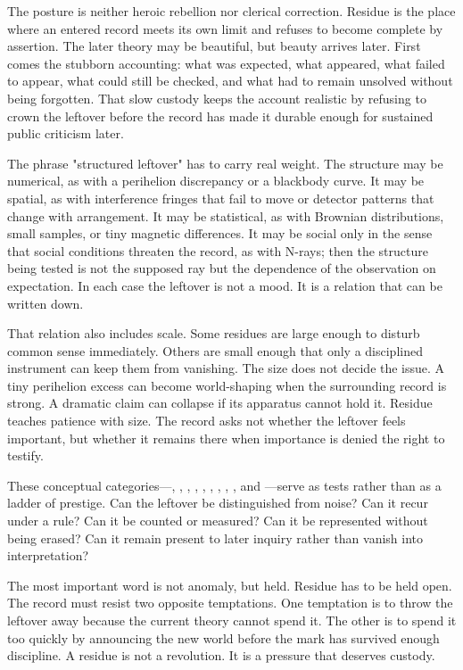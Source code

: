 \begin{chapteressay}
The posture is neither heroic rebellion nor clerical correction. Residue is the
place where an entered record meets its own limit and refuses to become complete
by assertion. The later theory may be beautiful, but beauty arrives later.
First comes the stubborn accounting: what was expected, what appeared, what
failed to appear, what could still be checked, and what had to remain unsolved
without being forgotten. That slow custody keeps the account realistic by
refusing to crown the leftover before the record has made it durable enough for
sustained public criticism later.

The phrase "structured leftover" has to carry real weight. The structure may
be numerical, as with a perihelion discrepancy or a blackbody curve. It may be
spatial, as with interference fringes that fail to move or detector patterns
that change with arrangement. It may be statistical, as with Brownian
distributions, small samples, or tiny magnetic differences. It may be social
only in the sense that social conditions threaten the record, as with N-rays;
then the structure being tested is not the supposed ray but the dependence of
the observation on expectation. In each case the leftover is not a mood. It is
a relation that can be written down.

That relation also includes scale. Some residues are large enough to disturb
common sense immediately. Others are small enough that only a disciplined
instrument can keep them from vanishing. The size does not decide the issue.
A tiny perihelion excess can become world-shaping when the surrounding record
is strong. A dramatic claim can collapse if its apparatus cannot hold it.
Residue teaches patience with size. The record asks not whether the leftover
feels important, but whether it remains there when importance is denied the
right to testify.

These conceptual categories---, ,
, , , ,
, , , and
---serve as tests rather than as a ladder of prestige. Can
the leftover be distinguished from noise? Can it recur under a rule? Can it be
counted or measured? Can it be represented without being erased? Can it remain
present to later inquiry rather than vanish into interpretation?

The most important word is not anomaly, but held. Residue has to be held open.
The record must resist two opposite temptations. One temptation is to throw the
leftover away because the current theory cannot spend it. The other is to
spend it too quickly by announcing the new world before the mark has survived
enough discipline. A residue is not a revolution. It is a pressure that
deserves custody.


\end{chapteressay}
